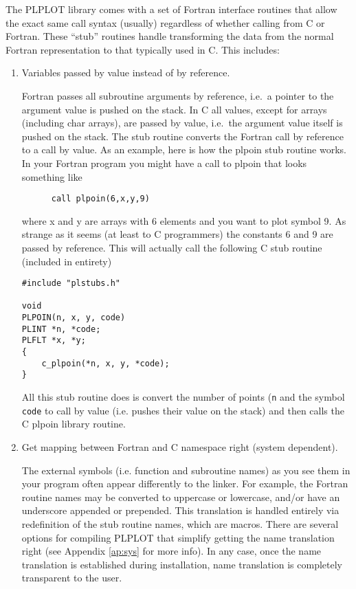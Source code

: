 The PLPLOT library comes with a set of Fortran interface routines that
allow the exact same call syntax (usually) regardless of whether calling
from C or Fortran.  These ``stub'' routines handle transforming the data
from the normal Fortran representation to that typically used in C.  This
includes:
\begin{enumerate}
\item Variables passed by value instead of by reference.

Fortran passes all subroutine arguments by reference, i.e.~a pointer to the
argument value is pushed on the stack.  In C all values, except for arrays
(including char arrays), are passed by value, i.e.~the argument value
itself is pushed on the stack.  The stub routine converts the Fortran call
by reference to a call by value.  As an example, here is how the plpoin stub
routine works.  In your Fortran program you might have a call to plpoin that
looks something like
\begin{verbatim}
      call plpoin(6,x,y,9)
\end{verbatim}

where x and y are arrays with 6 elements and you want to plot symbol 9.
As strange as it seems (at least to C programmers) the constants 6 and
9 are passed by reference.   This will actually call the following C
stub routine (included in entirety)
\begin{verbatim}
#include "plstubs.h"

void 
PLPOIN(n, x, y, code)
PLINT *n, *code;
PLFLT *x, *y;
{
    c_plpoin(*n, x, y, *code);
}
\end{verbatim}
All this stub routine does is convert the number of points ({\tt *n} and the
symbol {\tt *code} to call by value (i.e.  pushes their value on the stack)
and then calls the C plpoin library routine.

\item Get mapping between Fortran and C namespace right (system dependent).

The external symbols (i.e. function and subroutine names) as you see them
in your program often appear differently to the linker.  For example, the
Fortran routine names may be converted to uppercase or lowercase, and/or
have an underscore appended or prepended.  This translation is handled
entirely via redefinition of the stub routine names, which are macros.
There are several options for compiling PLPLOT that simplify getting the
name translation right (see Appendix \ref{ap:sys} for more info).  In any
case, once the name translation is established during installation, name
translation is completely transparent to the user.


\end{enumerate}
